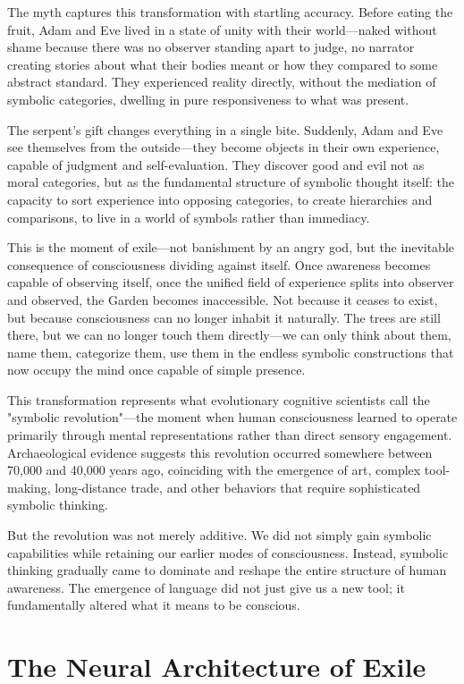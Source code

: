 The myth captures this transformation with startling accuracy. Before eating the fruit, Adam and Eve lived in a state of unity with their world—naked without shame because there was no observer standing apart to judge, no narrator creating stories about what their bodies meant or how they compared to some abstract standard. They experienced reality directly, without the mediation of symbolic categories, dwelling in pure responsiveness to what was present.

The serpent's gift changes everything in a single bite. Suddenly, Adam and Eve see themselves from the outside—they become objects in their own experience, capable of judgment and self-evaluation. They discover good and evil not as moral categories, but as the fundamental structure of symbolic thought itself: the capacity to sort experience into opposing categories, to create hierarchies and comparisons, to live in a world of symbols rather than immediacy.

This is the moment of exile—not banishment by an angry god, but the inevitable consequence of consciousness dividing against itself. Once awareness becomes capable of observing itself, once the unified field of experience splits into observer and observed, the Garden becomes inaccessible. Not because it ceases to exist, but because consciousness can no longer inhabit it naturally. The trees are still there, but we can no longer touch them directly—we can only think about them, name them, categorize them, use them in the endless symbolic constructions that now occupy the mind once capable of simple presence.

This transformation represents what evolutionary cognitive scientists call the "symbolic revolution"—the moment when human consciousness learned to operate primarily through mental representations rather than direct sensory engagement. Archaeological evidence suggests this revolution occurred somewhere between 70,000 and 40,000 years ago, coinciding with the emergence of art, complex tool-making, long-distance trade, and other behaviors that require sophisticated symbolic thinking.

But the revolution was not merely additive. We did not simply gain symbolic capabilities while retaining our earlier modes of consciousness. Instead, symbolic thinking gradually came to dominate and reshape the entire structure of human awareness. The emergence of language did not just give us a new tool; it fundamentally altered what it means to be conscious.

\section{The Neural Architecture of Exile}

